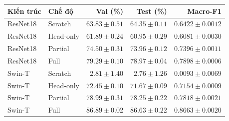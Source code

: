 \begin{tabular}{llrrr}
\toprule
Kiến trúc & Chế độ & Val (\%) & Test (\%) & Macro-F1 \\
\midrule
ResNet18 & Scratch & $63.83 \pm 0.51$ & $64.35 \pm 0.11$ & $0.6422 \pm 0.0012$ \\
ResNet18 & Head-only & $61.89 \pm 0.24$ & $60.95 \pm 0.29$ & $0.6081 \pm 0.0030$ \\
ResNet18 & Partial & $74.50 \pm 0.31$ & $73.96 \pm 0.12$ & $0.7396 \pm 0.0011$ \\
ResNet18 & Full & $79.29 \pm 0.10$ & $78.97 \pm 0.04$ & $0.7898 \pm 0.0006$ \\
Swin-T & Scratch & $2.81 \pm 1.40$ & $2.76 \pm 1.26$ & $0.0093 \pm 0.0069$ \\
Swin-T & Head-only & $72.45 \pm 0.10$ & $71.67 \pm 0.09$ & $0.7154 \pm 0.0009$ \\
Swin-T & Partial & $78.99 \pm 0.31$ & $78.25 \pm 0.22$ & $0.7818 \pm 0.0021$ \\
Swin-T & Full & $86.89 \pm 0.02$ & $86.63 \pm 0.22$ & $0.8663 \pm 0.0020$ \\
\bottomrule
\end{tabular}
